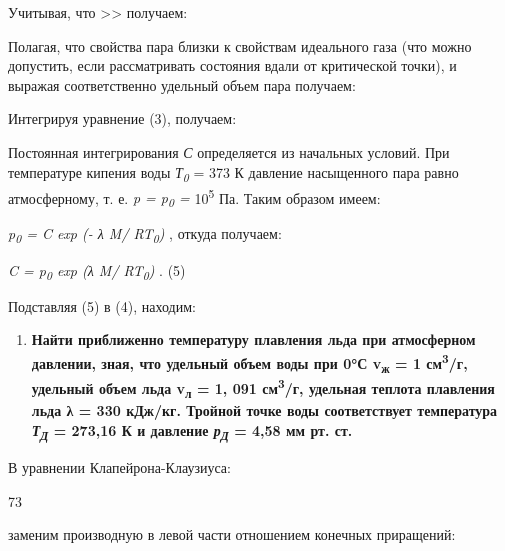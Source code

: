 Учитывая, что %
\textgreater\textgreater{} %
получаем:


Полагая, что свойства пара близки к свойствам идеального газа (что можно
допустить, если рассматривать состояния вдали от критической точки), и
выражая соответственно удельный объем пара
получаем:


Интегрируя уравнение (3), получаем:


Постоянная интегрирования \emph{С} определяется из начальных условий.
При температуре кипения воды \emph{Т\textsubscript{0}} = 373 К давление
насыщенного пара равно атмосферному, т. е. \emph{p = p\textsubscript{0}
=} 10\textsuperscript{5} Па. Таким образом имеем:

\emph{p\textsubscript{0} = C exp (- λ M/ RT\textsubscript{0})} , откуда
получаем:

\emph{C = p\textsubscript{0} exp (λ M/ RT\textsubscript{0})} . (5)

Подставляя (5) в (4), находим:


\begin{enumerate}
\def\labelenumi{\arabic{enumi}.}
\setcounter{enumi}{3}
\item
  \textbf{Найти приближенно температуру плавления льда при атмосферном
  давлении, зная, что удельный объем воды при 0°С v\textsubscript{ж} = 1
  см\textsuperscript{3}/г, удельный объем льда v\textsubscript{л} = 1,
  091 см\textsuperscript{3}/г, удельная теплота плавления льда λ = 330
  кДж/кг. Тройной точке воды соответствует температура
  \emph{Т\textsubscript{Д}} = 273,16 К и давление
  \emph{р\textsubscript{Д}} = 4,58 мм рт. ст.}
\end{enumerate}

\solving{}

В уравнении Клапейрона-Клаузиуса:


73

заменим производную в левой части отношением конечных приращений:


